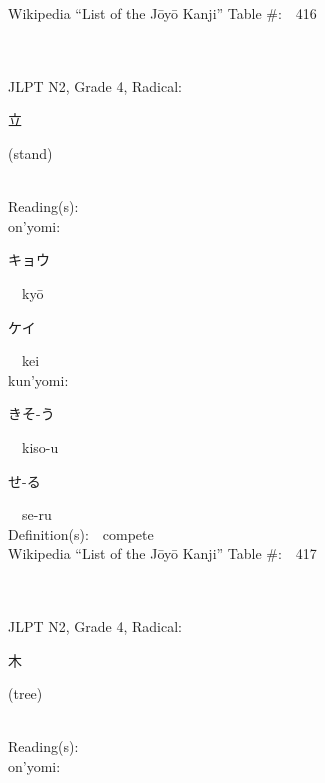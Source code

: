 \begin{multicols}{2}
Wikipedia ``List of the J\=oy\=o Kanji'' Table \#:\ \ 416 \\
\ \ \\
{\fontsize{34pt}{40pt}  }\ \ \\  %
{JLPT N2, Grade 4, Radical:\ \ {\begin{CJK}{UTF8}{min} 立 \end{CJK}} (stand) } \\
Reading(s):\ \ \\
{\hspace*{1em}}on'yomi:\ \ \\
{\hspace*{2em}}{\begin{CJK}{UTF8}{min} キョウ \end{CJK}}\ \ ky\=o\ \ \\
{\hspace*{2em}}{\begin{CJK}{UTF8}{min} ケイ \end{CJK}}\ \ kei\ \ \\
{\hspace*{1em}}kun'yomi:\ \ \\
{\hspace*{2em}}{\begin{CJK}{UTF8}{min} きそ-う \end{CJK}}\ \ kiso-u\ \ \\
{\hspace*{2em}}{\begin{CJK}{UTF8}{min} せ-る \end{CJK}}\ \ se-ru\ \ \\
Definition(s):\ \ compete \\
Wikipedia ``List of the J\=oy\=o Kanji'' Table \#:\ \ 417 \\
\ \ \\
{\fontsize{34pt}{40pt}  }\ \ \\  %
{JLPT N2, Grade 4, Radical:\ \ {\begin{CJK}{UTF8}{min} 木 \end{CJK}} (tree) } \\
Reading(s):\ \ \\
{\hspace*{1em}}on'yomi:\ \ \\

\end{multicols}
